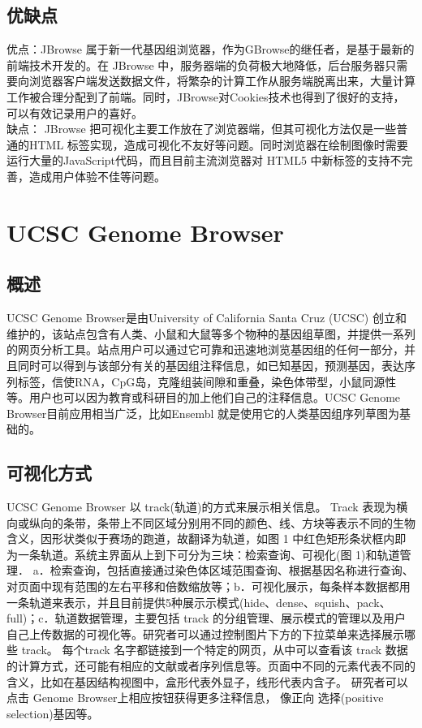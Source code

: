 		\subsection{优缺点}
		优点：JBrowse 属于新一代基因组浏览器，作为GBrowse的继任者，是基于最新的前端技术开发的。在 JBrowse 中，服务器端的负荷极大地降低，后台服务器只需要向浏览器客户端发送数据文件，将繁杂的计算工作从服务端脱离出来，大量计算工作被合理分配到了前端。同时，JBrowse对Cookies技术也得到了很好的支持，可以有效记录用户的喜好。\\
		\indent 缺点： JBrowse 把可视化主要工作放在了浏览器端，但其可视化方法仅是一些普通的HTML 标签实现，造成可视化不友好等问题。同时浏览器在绘制图像时需要运行大量的JavaScript代码，而且目前主流浏览器对 HTML5 中新标签的支持不完善，造成用户体验不佳等问题。
	\section{UCSC Genome Browser}		
			\subsection{概述}	
			UCSC Genome Browser是由University of California Santa Cruz (UCSC) 创立和维护的，该站点包含有人类、小鼠和大鼠等多个物种的基因组草图，并提供一系列的网页分析工具。站点用户可以通过它可靠和迅速地浏览基因组的任何一部分，并且同时可以得到与该部分有关的基因组注释信息，如已知基因，预测基因，表达序列标签，信使RNA，CpG岛，克隆组装间隙和重叠，染色体带型，小鼠同源性等。用户也可以因为教育或科研目的加上他们自己的注释信息。UCSC Genome Browser目前应用相当广泛，比如Ensembl 就是使用它的人类基因组序列草图为基础的。
			\subsection{可视化方式}		
			UCSC Genome Browser 以 track(轨道)的方式来展示相关信息。 Track 表现为横向或纵向的条带，条带上不同区域分别用不同的颜色、线、方块等表示不同的生物含义，因形状类似于赛场的跑道，故翻译为轨道，如图 1 中红色矩形条状框内即为一条轨道。系统主界面从上到下可分为三块：检索查询、可视化(图 1)和轨道管理． a．检索查询，包括直接通过染色体区域范围查询、根据基因名称进行查询、对页面中现有范围的左右平移和倍数缩放等；b．可视化展示，每条样本数据都用一条轨道来表示，并且目前提供5种展示示模式(hide、dense、squish、pack、full)；c．轨道数据管理，主要包括 track 的分组管理、展示模式的管理以及用户自己上传数据的可视化等。研究者可以通过控制图片下方的下拉菜单来选择展示哪些 track。 每个track 名字都链接到一个特定的网页，从中可以查看该 track 数据的计算方式，还可能有相应的文献或者序列信息等。页面中不同的元素代表不同的含义，比如在基因结构视图中，盒形代表外显子，线形代表内含子。 研究者可以点击 Genome Browser上相应按钮获得更多注释信息， 像正向 选择(positive selection)基因等。
